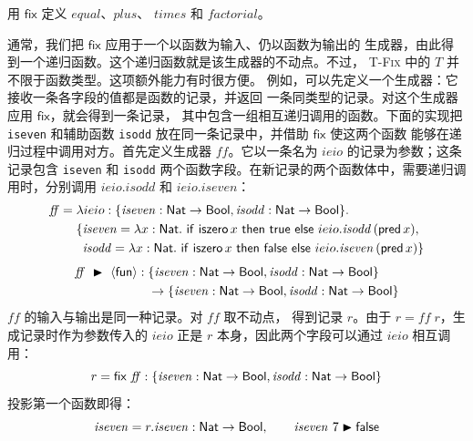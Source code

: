 \begin{exercise}[\(\star\star\)]
\label{ex:11.11.1}
用 \(\mathsf{fix}\) 定义 \(\mathit{equal}\)、\(\mathit{plus}\)、
\(\mathit{times}\) 和 \(\mathit{factorial}\)。
\end{exercise}

通常，我们把 \(\mathsf{fix}\) 应用于一个以函数为输入、仍以函数为输出的
生成器，由此得到一个递归函数。这个递归函数就是该生成器的不动点。不过，
\textsc{T-Fix} 中的 \(T\) 并不限于函数类型。这项额外能力有时很方便。
例如，可以先定义一个生成器：它接收一条各字段的值都是函数的记录，并返回
一条同类型的记录。对这个生成器应用 \(\mathsf{fix}\)，就会得到一条记录，
其中包含一组相互递归调用的函数。下面的实现把 \texttt{iseven} 和辅助函数
\texttt{isodd} 放在同一条记录中，并借助 \(\mathsf{fix}\) 使这两个函数
能够在递归过程中调用对方。首先定义生成器 \(\mathit{ff}\)。它以一条名为
\(ieio\) 的记录为参数；这条记录包含 \texttt{iseven} 和 \texttt{isodd}
两个函数字段。在新记录的两个函数体中，需要递归调用时，分别调用
\(ieio.\mathit{isodd}\) 和
\(ieio.\mathit{iseven}\)：
\[
\begin{aligned}
\mathit{ff}={}&\lambda ieio:
\{\mathit{iseven}:\tapltype{Nat}\to\tapltype{Bool},
  \mathit{isodd}:\tapltype{Nat}\to\tapltype{Bool}\}.\\
&\{\mathit{iseven}=\lambda x:\tapltype{Nat}.\
  \mathsf{if}\ \tapliszero{x}\ \mathsf{then}\ \tapltrue\
  \mathsf{else}\ ieio.\mathit{isodd}\,(\taplpred{x}),\\
&\phantom{\{}
  \mathit{isodd}=\lambda x:\tapltype{Nat}.\
  \mathsf{if}\ \tapliszero{x}\ \mathsf{then}\ \taplfalse\
  \mathsf{else}\ ieio.\mathit{iseven}\,(\taplpred{x})\}
\end{aligned}
\]
\[
\begin{aligned}
\mathit{ff}\ \blacktriangleright\ \langle\mathsf{fun}\rangle:\;&
\{\mathit{iseven}:\mathsf{Nat}\to\mathsf{Bool},
  \mathit{isodd}:\mathsf{Nat}\to\mathsf{Bool}\}\\
&{}\to
\{\mathit{iseven}:\mathsf{Nat}\to\mathsf{Bool},
  \mathit{isodd}:\mathsf{Nat}\to\mathsf{Bool}\}
\end{aligned}
\]
\(\mathit{ff}\) 的输入与输出是同一种记录。对 \(\mathit{ff}\) 取不动点，
得到记录 \(r\)。由于 \(r=\mathit{ff}\;r\)，生成记录时作为参数传入的
\(ieio\) 正是 \(r\) 本身，因此两个字段可以通过 \(ieio\) 相互调用：
\[
r=\mathsf{fix}\ \mathit{ff}:
\{\mathit{iseven}:\mathsf{Nat}\to\mathsf{Bool},
  \mathit{isodd}:\mathsf{Nat}\to\mathsf{Bool}\}
\]
投影第一个函数即得：
\[
\mathit{iseven}=r.\mathit{iseven}:
\mathsf{Nat}\to\mathsf{Bool},
\qquad
\mathit{iseven}\ 7\blacktriangleright\mathsf{false}
\]

